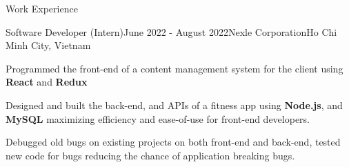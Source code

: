 \documentclass[
	11pt, %
]{resume} %
\begin{document}
\begin{rSection}{Work Experience}
	\begin{rSubsection}{Software Developer (Intern)}{June 2022 - August 2022}{Nexle Corporation}{Ho Chi Minh City, Vietnam}
		\item Programmed the front-end of a content management system for the client using \textbf{React} and \textbf{Redux}
		\item Designed and built the back-end, and APIs of a fitness app using \textbf{Node.js}, and \textbf{MySQL} maximizing efficiency and ease-of-use for front-end developers.
		\item Debugged old bugs on existing projects on both front-end and back-end, tested new code for bugs reducing the chance of application breaking bugs.
	\end{rSubsection}

\end{rSection}

%
%







\end{document}
